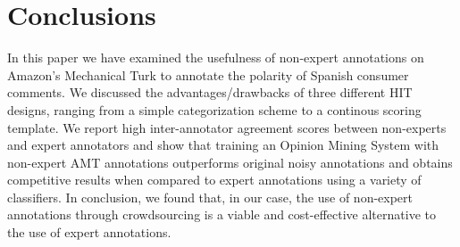 \documentclass[11pt,letterpaper]{article}
\begin{document}
\section{Conclusions}
\label{sect:conclusions}
In this paper we have examined the usefulness of non-expert annotations on Amazon's Mechanical Turk to annotate the polarity of Spanish consumer comments. We discussed the advantages/drawbacks of three different HIT designs, ranging from a simple categorization scheme to a continous scoring template. We report high inter-annotator agreement scores between non-experts and expert annotators and show that training an Opinion Mining System with non-expert AMT annotations outperforms original noisy annotations and obtains competitive results when compared to expert annotations using a variety of classifiers. In conclusion, we found that, in our case, the use of non-expert annotations through crowdsourcing is a viable and cost-effective alternative to the use of expert annotations.





\end{document}
